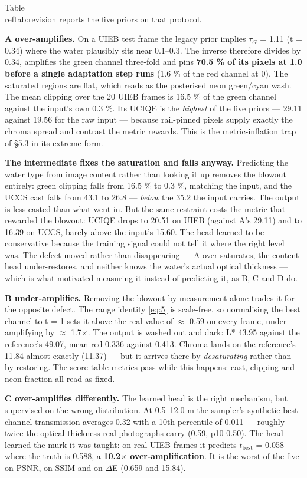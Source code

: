\documentclass[journal]{IEEEtran}
\begin{document}
Table~\\ref{tab:revision} reports the five priors on that protocol.

\textbf{A over-amplifies.} On a UIEB test frame the legacy prior implies $\tau_G$ = 1.11 (t = 0.34) where the water plausibly sits near 0.1--0.3. The inverse therefore divides by 0.34, amplifies the green channel three-fold and pins \textbf{70.5 \% of its pixels at 1.0 before a single adaptation step runs} (1.6 \% of the red channel at 0). The saturated regions are flat, which reads as the posterised neon green/cyan wash. The mean clipping over the 20 UIEB frames is 16.5 \% of the green channel against the input's own 0.3 \%. Its UCIQE is the \emph{highest} of the five priors --- 29.11 against 19.56 for the raw input --- because rail-pinned pixels supply exactly the chroma spread and contrast the metric rewards. This is the metric-inflation trap of \S{}5.3 in its extreme form.

\textbf{The intermediate fixes the saturation and fails anyway.} Predicting the water type from image content rather than looking it up removes the blowout entirely: green clipping falls from 16.5 \% to 0.3 \%, matching the input, and the UCCS cast falls from 43.1 to 26.8 --- \emph{below} the 35.2 the input carries. The output is less casted than what went in. But the same restraint costs the metric that rewarded the blowout: UCIQE drops to 20.51 on UIEB (against A's 29.11) and to 16.39 on UCCS, barely above the input's 15.60. The head learned to be conservative because the training signal could not tell it where the right level was. The defect moved rather than disappearing --- A over-saturates, the content head under-restores, and neither knows the water's actual optical thickness --- which is what motivated measuring it instead of predicting it, as B, C and D do.

\textbf{B under-amplifies.} Removing the blowout by measurement alone trades it for the opposite defect. The range identity \eqref{eq:5} is scale-free, so normalising the best channel to t = 1 sets it above the real value of $\approx$ 0.59 on every frame, under-amplifying by $\approx$ 1.7$\times$. The output is washed out and dark: L* 43.95 against the reference's 49.07, mean red 0.336 against 0.413. Chroma lands on the reference's 11.84 almost exactly (11.37) --- but it arrives there by \emph{desaturating} rather than by restoring. The score-table metrics pass while this happens: cast, clipping and neon fraction all read as fixed.

\textbf{C over-amplifies differently.} The learned head is the right mechanism, but supervised on the wrong distribution. At 0.5--12.0 m the sampler's synthetic best-channel transmission averages 0.32 with a 10th percentile of 0.011 --- roughly twice the optical thickness real photographs carry (0.59, p10 0.50). The head learned the murk it was taught: on real UIEB frames it predicts $t_{\mathrm{best}}$ = 0.058 where the truth is 0.588, a \textbf{10.2$\times$ over-amplification}. It is the worst of the five on PSNR, on SSIM and on $\Delta$E (0.659 and 15.84).
\end{document}
